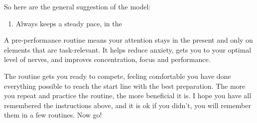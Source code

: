 \documentclass[12pt]{article}
\begin{document}
So here are the general suggestion of the model:
\begin{enumerate}
    \item Always keeps a steady pace, in the %
\end{enumerate}

A pre-performance routine means your attention stays in the present and only on elements that are task-relevant. It helps reduce anxiety, gets you to your optimal level
of nerves, and improves concentration, focus and performance.

The routine gets you ready to compete, feeling comfortable you have done everything possible to reach the start line with the best preparation. The more you repeat and
practice the routine, the more beneficial it is. I hope you have all remembered the instructions above, and it is ok if you didn't, you will remember them in a few routines.
Now go!




\end{document}
